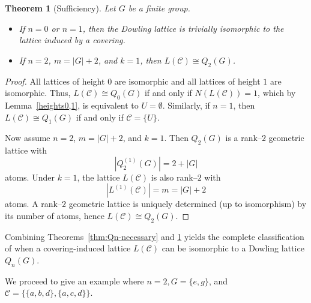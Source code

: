 \documentclass{article}
\newtheorem{theorem}{Theorem}[section]
\begin{document}
\begin{theorem}[Sufficiency]\label{thm:Qn-sufficient}
Let \(G\) be a finite group.
\begin{itemize}
\item If $n=0$ or $n=1$, then the Dowling lattice is trivially isomorphic to the lattice induced by a covering.
\item If \(n=2\), \(m=|G|+2\), and \(k=1\), then \(L(\mathcal C)\cong Q_2(G)\).
\end{itemize}
\end{theorem}

\begin{proof}
 All lattices of height  $0$ are isomorphic and all lattices of height  $1$  are isomorphic. Thus, $L(\mathcal{C})\cong Q_0(G)$ if and only if $N(L(\mathcal{C}))=1$, which by Lemma~\ref{heights0,1}, is equivalent to $U = \emptyset$. Similarly, if $n=1$, then $L(\mathcal{C})\cong Q_1(G)$ if and only if $\mathcal{C}=\{U\}$.

Now assume \(n=2\), \(m=|G|+2\), and \(k=1\).
Then \(Q_2(G)\) is a rank--\(2\) geometric lattice with
\[
|Q_2^{(1)}(G)|=2+|G|
\]
atoms. Under \(k=1\), the lattice \(L(\mathcal C)\) is also rank--\(2\) with
\[
|L^{(1)}(\mathcal C)|=m=|G|+2
\]
atoms. A rank--\(2\) geometric lattice is uniquely determined (up to isomorphism) by its number of atoms, hence \(L(\mathcal C)\cong Q_2(G)\).
\end{proof}

Combining Theorems~\ref{thm:Qn-necessary} and \ref{thm:Qn-sufficient} yields the complete classification of when a covering-induced lattice \(L(\mathcal C)\) can be isomorphic to a Dowling lattice \(Q_n(G)\).



    We proceed to give an example where $n=2, G = \{e,g\}$, and $\mathcal{C}=\{\{a,b,d\},\{a,c,d\}\}$.
\end{document}
